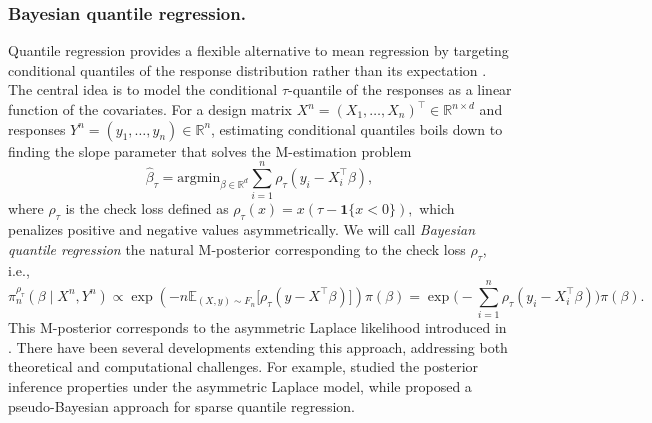 \documentclass[11pt, oneside]{amsart}
\theoremstyle{definition}   %
\newcommand{\E}{\mathbb{E}}
\newcommand{\R}{\mathbb{R}}
\newcommand{\loss}{\rho}
\begin{document}
\subsubsection{Bayesian quantile regression.}
\label{subsetion::bayesian-quantile-regression}
%
Quantile regression provides a flexible alternative to mean regression by targeting conditional quantiles of the response distribution rather than its expectation \citep{koenker:bassett1978,koenker2005}. The central idea is to model the conditional $\tau$-quantile of the responses as a linear function of the covariates. For a design matrix \( X^n=(X_{1},\dots,X_{n})^\top \in\R^{n\times d} \) and responses \( Y^n=(y_{1},\dots,y_{n})\in\R^n \), estimating conditional quantiles boils down to finding the slope parameter that solves the M-estimation problem
%
\begin{equation*}
    \hat\beta_{\tau}=\mbox{argmin}_{\beta\in\mathbb{R}^d}\sum_{i=1}^n\rho_\tau(y_i-X_i^\top\beta),
\end{equation*}
%
where $\rho_\tau$ is the check loss defined as 
%
\(
    \loss_\tau(x) = x ( \tau - \mathbf{1}\{ x < 0 \} ),
\)
%
which penalizes positive and negative values asymmetrically.  We will call 
%
   \emph{Bayesian quantile regression} the natural M-posterior corresponding to the check loss \( \loss_\tau\), i.e.,
%
\begin{equation*}
    \pi_n^{\loss_\tau} (\beta \mid X^n, Y^n) \propto
    \exp \left (- n \E_{(X, y) \sim F_n} \bigl [ \loss_\tau (y - X^\top \beta) \bigr ] \right ) \pi(\beta)  =
    \exp \Big ( - \sum_{i=1}^n \loss_\tau (y_i - X_i^\top \beta)  \Big ) \pi(\beta) .
\end{equation*}
%
This M-posterior corresponds to the asymmetric Laplace likelihood introduced in \citet{yu:moyeed2001}. %
There have been several developments extending this approach, addressing both theoretical and computational challenges. For example, \cite{yang:wang:he2016} studied the posterior inference properties under the asymmetric Laplace model, while \citet{li:he2024} proposed a pseudo-Bayesian approach for sparse quantile regression. 
\end{document}
